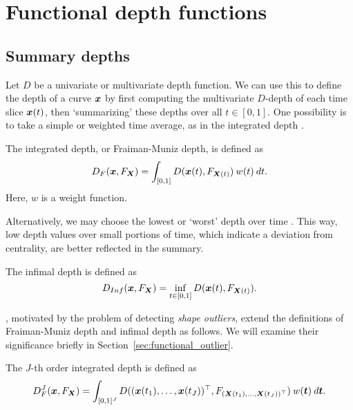 \section{Functional depth functions}

\subsection{Summary depths}

Let $D$ be a univariate or multivariate depth function.
We can use this to define the depth of a curve $\bm{x}$ by first computing the
multivariate $D$-depth of each time slice $\bm{x}(t)$, then `summarizing' these
depths over all $t \in [0, 1]$.
One possibility is to take a simple or weighted time average, as in the
integrated depth \parencite{fraiman-muniz-2001}.

\begin{definition}
    \label{def:FM_depth}
    The integrated depth, or Fraiman-Muniz depth, is defined as
    \begin{equation}
        D_F(\bm{x}, F_{\bm{X}}) = \int_{[0, 1]} D(\bm{x}(t), F_{\bm{X}(t)})\:w(t)\:dt.
    \end{equation}
    Here, $w$ is a weight function.
\end{definition}

Alternatively, we may choose the lowest or `worst' depth over time
\parencite{mosler-2013}.
This way, low depth values over small portions of time, which indicate a
deviation from centrality, are better reflected in the summary.

\begin{definition}
    The infimal depth is defined as
    \begin{equation}
        D_{Inf}(\bm{x}, F_{\bm{X}}) = \inf_{t \in [0, 1]} D(\bm{x}(t), F_{\bm{X}(t)}).
    \end{equation}
\end{definition}


\textcite{nagy-gijbels-hlubinka-2017}, motivated by the problem of detecting
\emph{shape outliers}, extend the definitions of Fraiman-Muniz depth and
infimal depth as follows.
We will examine their significance briefly in
Section~\ref{sec:functional_outlier}.

\begin{definition} \label{def:J_FM_depth}
    The $J$-th order integrated depth is defined as
    \begin{equation}
        D_F^J(\bm{x}, F_{\bm{X}}) = \int_{[0, 1]^J} D((\bm{x}(t_1), \dots, \bm{x}(t_J))^\top, F_{(\bm{X}(t_1), \dots, \bm{X}(t_J))^\top}) \:w(\bm{t})\:d\bm{t}.
    \end{equation}
\end{definition}

